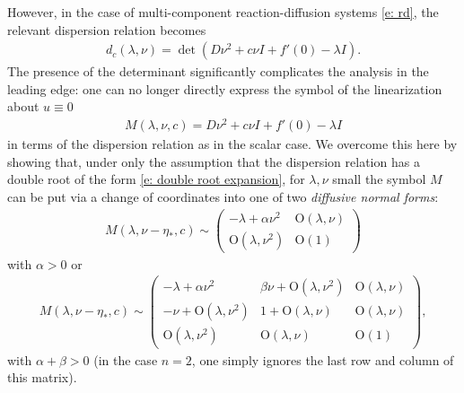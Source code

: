 \documentclass[11pt]{article}
\numberwithin{equation}{section}
\numberwithin{prop}{section}
\begin{document}
However, in the case of multi-component reaction-diffusion systems \eqref{e: rd}, the relevant dispersion relation becomes 
\begin{align}
d_c (\lambda, \nu) = \det \left( D \nu^2 + c \nu I + f'(0) - \lambda I \right). 
\end{align}
The presence of the determinant significantly complicates the analysis in the leading edge: one can no longer directly express the symbol of the linearization about $u \equiv 0$
\begin{align}
M(\lambda, \nu, c) = D \nu^2 + c \nu I + f'(0) - \lambda I \label{e: original symbol def}
\end{align}
in terms of the dispersion relation as in the scalar case. We overcome this here by showing that, under only the assumption that the dispersion relation has a double root of the form \eqref{e: double root expansion}, for $\lambda, \nu$ small the symbol $M$ can be put via a change of coordinates into one of two \emph{diffusive normal forms}:
\begin{align}
M(\lambda, \nu-\eta_*, c) \sim \begin{pmatrix}
- \lambda + \alpha \nu^2 & \mathrm{O}(\lambda, \nu) \\
\mathrm{O}(\lambda, \nu^2) & \mathrm{O}(1) 
\end{pmatrix} \label{e: normal 1}
\end{align}
with $\alpha > 0$ or 
\begin{align}
M(\lambda, \nu-\eta_*, c) \sim \begin{pmatrix} - \lambda + \alpha \nu^2 &  \beta \nu + \mathrm{O}(\lambda, \nu^2) & \mathrm{O}(\lambda, \nu) \\
- \nu + \mathrm{O}(\lambda, \nu^2) & 1 + \mathrm{O}(\lambda, \nu) & \mathrm{O}(\lambda, \nu) \\
\mathrm{O}(\lambda, \nu^2) & \mathrm{O}(\lambda, \nu) & \mathrm{O}(1)
\end{pmatrix}, \label{e: normal 2}
\end{align}
with $\alpha + \beta > 0$ (in the case $n=2$, one simply ignores the last row and column of this matrix). 
\end{document}
